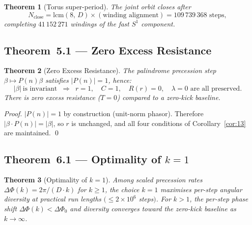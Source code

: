 \documentclass[12pt,a4paper]{article}
\theoremstyle{plain}
\newtheorem{theorem}{Theorem}[section]
\theoremstyle{definition}
\theoremstyle{remark}
\newcommand{\abs}[1]{\lvert #1 \rvert}
\begin{document}
\begin{theorem}[Torus super-period]\label{thm:torus}
  The joint orbit closes after
  \begin{equation}
    N_{\mathrm{close}} = \mathrm{lcm}(8,\, D) \times (\text{winding alignment})
                       = 109\,739\,368 \text{ steps},
    \label{eq:super-period}
  \end{equation}
  completing $41\,152\,271$ windings of the fast $S^1$ component.
\end{theorem}

\subsection{Theorem~5.1 — Zero Excess Resistance}

\begin{theorem}[Zero Excess Resistance]\label{thm:zero-overhead}
  The palindrome precession step $\beta \mapsto P(n)\beta$ satisfies
  $\abs{P(n)}=1$, hence:
  \begin{equation}
    \abs{\beta}\ \text{is invariant}
    \;\;\Rightarrow\;\;
    r = 1,\quad C = 1,\quad R(r) = 0,\quad \lambda = 0
    \text{ are all preserved.}
    \label{eq:zero-overhead}
  \end{equation}
  There is \emph{zero excess resistance} ($T=0$) compared to a zero-kick
  baseline.
\end{theorem}

\begin{proof}
  $\abs{P(n)}=1$ by construction (unit-norm phasor).  Therefore
  $\abs{\beta\cdot P(n)} = \abs{\beta}$, so $r$ is unchanged, and all four
  conditions of Corollary~\ref{cor:13} are maintained. \qed
\end{proof}

\subsection{Theorem~6.1 — Optimality of $k=1$}

\begin{theorem}[Optimality of $k=1$]\label{thm:optimality}
  Among scaled precession rates $\Delta\Phi(k) = 2\pi/(D\cdot k)$ for
  $k\ge1$, the choice $k=1$ maximises per-step angular diversity at
  practical run lengths $(\le 2\times10^6$ steps$)$.  For $k>1$, the
  per-step phase shift $\Delta\Phi(k) < \Delta\Phi_0$ and diversity
  converges toward the zero-kick baseline as $k\to\infty$.
\end{theorem}
\end{document}
